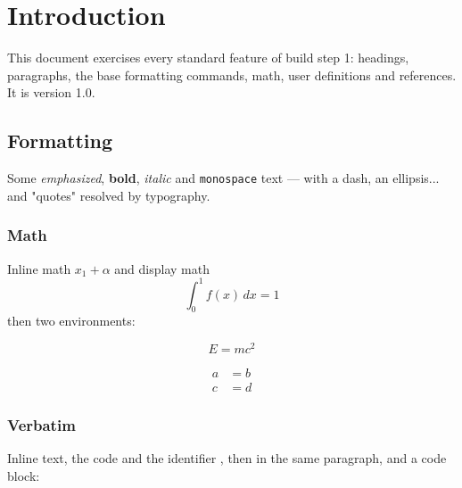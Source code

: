 \flmHeading[toc=true]
\section{Introduction}{\flmLabels{\label{ref1}}}

This document exercises every standard feature of build step 1: headings,
paragraphs, the base formatting commands, math, user definitions and
references. It is version 1.0.

\flmHeading[toc=true]
\subsection{Formatting}{\flmLabels{\label{ref2}}}

Some \emph{emphasized}, \textbf{bold}, \textit{italic} and \texttt{monospace}
text --- with a dash, an ellipsis... and "quotes" resolved by typography.

\flmHeading[toc=true]
\subsubsection{Math}{\flmLabels{}}

Inline math \(x_1 + \alpha\) and display math \[ \int_0^1 f(x)\,dx = 1 \] then
two environments:

\begin{equation}
  E = mc^2
\end{equation}

\begin{align*}
  a &= b \\
  c &= d
\end{align*}

\flmHeading[toc=true]
\subsubsection{Verbatim}{\flmLabels{}}

Inline  text, the code  and the
identifier , then 
in the same paragraph, and a code block:

